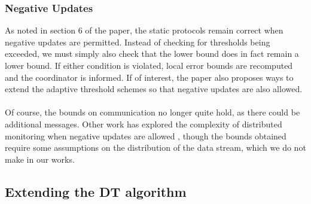 \documentclass{article}
\begin{document}
\subsubsection*{Negative Updates}
As noted in section 6 of the paper, the static protocols remain correct when negative updates are permitted. Instead of checking for thresholds being exceeded, we must simply also check that the lower bound does in fact remain a lower bound. If either condition is violated, local error bounds are recomputed and the coordinator is informed. If of interest, the paper also proposes ways to extend the adaptive threshold schemes so that negative updates are also allowed. \\
\\
Of course, the bounds on communication no longer quite hold, as there could be additional messages. Other work has explored the complexity of distributed monitoring when negative updates are allowed \cite{DTwithoutmonotonicity}, though the bounds obtained require some assumptions on the distribution of the data stream, which we do not make in our works.

\newpage
\subsection*{Extending the DT algorithm}
\end{document}
